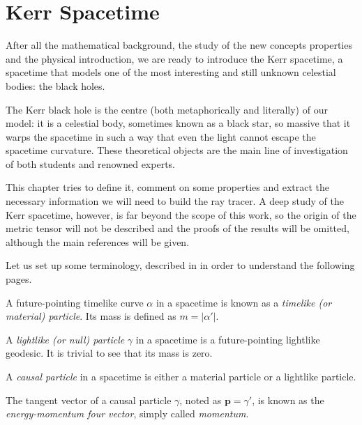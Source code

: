 \chapter{Kerr Spacetime}
\label{chapter:kerr}

After all the mathematical background, the study of the new concepts properties and the physical introduction, we are ready to introduce the Kerr spacetime, a spacetime that models one of the most interesting and still unknown celestial bodies: the black holes.

The Kerr black hole is the centre (both metaphorically and literally) of our model: it is a celestial body, sometimes known as a black star, so massive that it warps the spacetime in such a way that even the light cannot escape the spacetime curvature. These theoretical objects are the main line of investigation of both students and renowned experts.

This chapter tries to define it, comment on some properties and extract the necessary information we will need to build the ray tracer. A deep study of the Kerr spacetime, however, is far beyond the scope of this work, so the origin of the metric tensor will not be described and the proofs of the results will be omitted, although the main references will be given.

Let us set up some terminology, described in \cite[Def. 1.6.2, 1.6.3]{oneill95} in order to understand the following pages.

\begin{definition}
	A future-pointing timelike curve $\alpha$ in a spacetime is known as a \emph{timelike (or material) particle}. Its mass is defined as $m = \vert \alpha' \vert$.
\end{definition}

\begin{definition}
	A \emph{lightlike (or null) particle} $\gamma$ in a spacetime is a future-pointing lightlike geodesic. It is trivial to see that its mass is zero.
\end{definition}

\begin{definition}
	A \emph{causal particle} in a spacetime is either a material particle or a lightlike particle.
\end{definition}

The tangent vector of a causal particle $\gamma$, noted as $\mathbf{p} = \gamma'$, is known as the \emph{energy-momentum four vector}, simply called \emph{momentum}.

